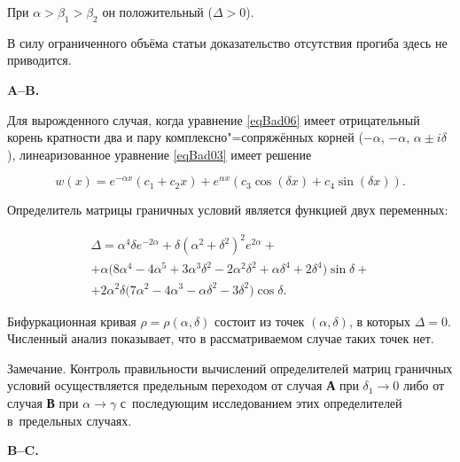 При $\alpha>\beta_1>\beta_2$ он положительный ($\Delta>0$).



В силу ограниченного объёма статьи доказательство отсутствия прогиба здесь не приводится.



\smallskip



\textbf{A--B.} 

Для вырожденного случая, когда уравнение \eqref{eqBad06} имеет отрицательный корень кратности два и пару комплексно"=сопряжённых корней ($-\alpha $, $-\alpha $, \mbox{$\alpha \pm i \delta $)}, линеаризованное уравнение \eqref{eqBad03} имеет решение 

$$w(x)= e^{-\alpha x}\left(c_1 + c_2 x \right)+e^{\alpha x}\left(c_3 \cos(\delta x)+ c_4 \sin(\delta x) \right).$$ 

Определитель матрицы граничных условий является функцией двух переменных:

\begin{multline*}

\Delta=\alpha^4\delta e^{-2\alpha}+\delta(\alpha^2+\delta^2)^2 e^{2\alpha}+\\

+\alpha\big( 8\alpha^4-4\alpha^5+3\alpha^3\delta^2-2\alpha^2\delta^2+\alpha\delta^4+2\delta^4 \big)\sin\delta+\\

+2\alpha^2 \delta\bigl( 7\alpha^2-4\alpha^3-\alpha\delta^2-3\delta^2 \bigr)\cos\delta.

\end{multline*}

Бифуркационная кривая $\rho=\rho (\alpha,\delta)$ состоит из точек $(\alpha,\delta)$, в которых \mbox{$\Delta=0$}. Численный анализ показывает, что в рассматриваемом случае таких точек нет.



\smallskip



{\small \sc Замечание.} Контроль правильности вычислений определителей матриц граничных условий осуществляется предельным переходом от случая \textbf{А} при $\delta_1 \rightarrow 0$ либо от случая \textbf{В} при $\alpha\rightarrow \gamma$ с~последующим исследованием этих  определителей в~предельных случаях.



\smallskip



\textbf{B--C.} 

